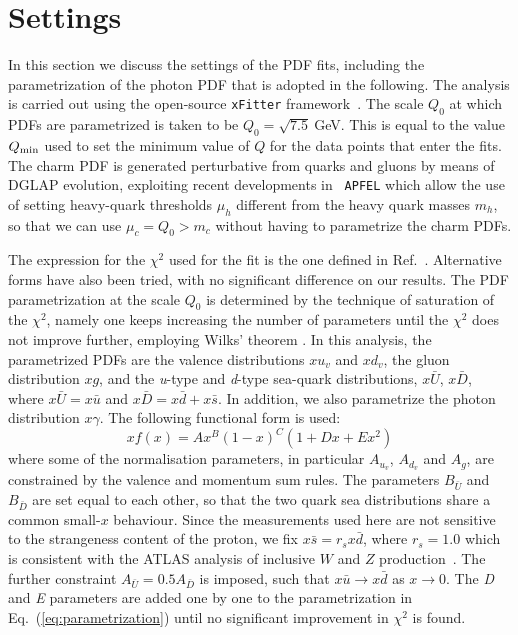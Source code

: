 \section{Settings}
\label{sec:fitsettings}

In this section we discuss the settings of the PDF fits, including the
parametrization of the photon PDF that is adopted in the following.
%
The analysis is carried out using the open-source {\tt xFitter}
framework~\cite{Alekhin:2014irh}.
%
The scale $Q_0$ at which PDFs are parametrized is taken to be
$Q_0 = \sqrt{7.5}~$GeV.
%
This is equal to the value $Q_{\rm min}$ used to set the minimum value
of $Q$ for the data points that enter the fits.
%
The charm PDF is generated perturbative from quarks and gluons by
means of DGLAP evolution, exploiting recent developments in {\tt
  APFEL} which allow the use of setting heavy-quark thresholds $\mu_h$
different from the heavy quark masses $m_h$, so that we can use
$\mu_c=Q_0 > m_c$ without having to parametrize the charm PDFs.

The expression for the $\chi^2$ used for the fit is the one defined in
Ref.~\cite{Aaron:2009aa}.
%
Alternative forms have also been tried, with no significant difference
on our results.
% 
The PDF parametrization at the scale $Q_0$ is determined by the
technique of saturation of the $\chi^{2}$, namely one keeps increasing
the number of parameters until the $\chi^{2}$ does not improve
further, employing Wilks' theorem \cite{Wilks}.
%
In this analysis, the parametrized PDFs are the valence distributions
$xu_{v}$ and $xd_{v}$, the gluon distribution $xg$, and the
\textit{u}-type and \textit{d}-type sea-quark distributions,
$x\bar{U}$, $x\bar{D}$, where $x\bar{U} = x\bar{u}$ and
$x\bar{D} = x\bar{d} + x\bar{s}$.
%
In addition, we also parametrize the photon distribution $x\gamma$.
%
The following functional form is used:
\begin{equation}
  \label{eq:parametrization}
xf(x) = Ax^{B}(1-x)^{C}(1+Dx+Ex^{2})
\end{equation}
where some of the normalisation parameters, in particular $A_{u_{v}}$,
$A_{d_{v}}$ and $A_{g}$, are constrained by the valence and momentum
sum rules.
%
The parameters $B_{\bar{U}}$ and $B_{\bar{D}}$ are set equal to each
other, so that the two quark sea distributions share a common
small-$x$ behaviour.
%
Since the measurements used here are not sensitive to the strangeness
content of the proton, we fix $x\bar{s} = r_sx\bar{d}$, where
$r_s=1.0$ which is consistent with the ATLAS analysis of inclusive $W$
and $Z$ production~\cite{Aad:2012sb,Aaboud:2016btc}.
%
The further constraint $A_{\bar{U}} = 0.5 A_{\bar{D}}$ is imposed,
such that $x\bar{u} \to x\bar{d}$ as $x \to 0$.  The \textit{D} and
\textit{E} parameters are added one by one to the parametrization in
Eq.~(\ref{eq:parametrization}) until no significant improvement in
$\chi^{2}$ is found.

